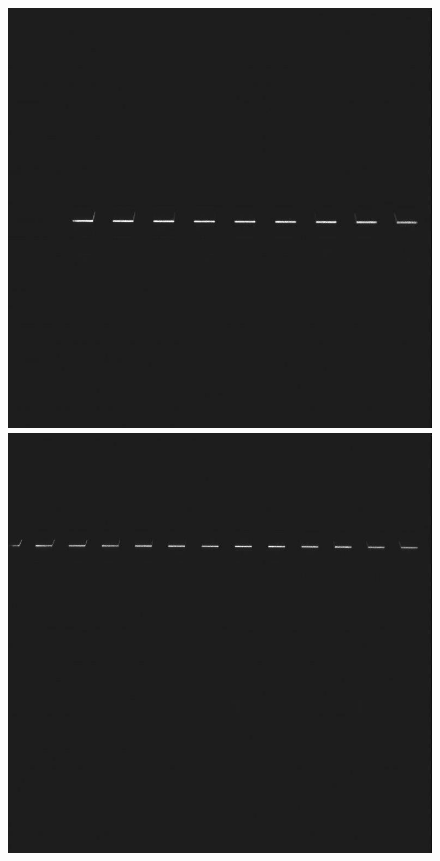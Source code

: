   \begin{figure}[!b]
    \centering
    \begin{minipage}[c]{.32\textwidth}
      \centering
      \includegraphics[width=\textwidth]{./images/analysis/exp3/250.jpg}
    \end{minipage}
    \hfill
    \begin{minipage}[c]{.32\textwidth}
      \centering
      \includegraphics[width=\textwidth]{./images/analysis/exp3/380.jpg}

\end{minipage}
\end{figure}

